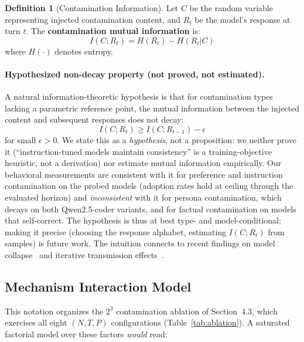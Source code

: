 \documentclass{article}
\theoremstyle{plain}
\theoremstyle{definition}
\newtheorem{definition}[theorem]{Definition}
\begin{document}
\begin{definition}[Contamination Information]
Let $C$ be the random variable representing injected contamination content, and $R_t$ be the model's response at turn $t$. The \textbf{contamination mutual information} is:
\begin{equation}
I(C; R_t) = H(R_t) - H(R_t | C)
\end{equation}
where $H(\cdot)$ denotes entropy.
\end{definition}

\paragraph{Hypothesized non-decay property (not proved, not estimated).}
A natural information-theoretic hypothesis is that for contamination types lacking a parametric reference point, the mutual information between the injected content and subsequent responses does not decay:
\begin{equation}
I(C; R_t) \geq I(C; R_{t-1}) - \epsilon
\end{equation}
for small $\epsilon > 0$. We state this as a \emph{hypothesis}, not a proposition: we neither prove it (``instruction-tuned models maintain consistency'' is a training-objective heuristic, not a derivation) nor estimate mutual information empirically. Our behavioral measurements are consistent with it for preference and instruction contamination on the probed models (adoption rates hold at ceiling through the evaluated horizon) and \emph{inconsistent} with it for persona contamination, which decays on both Qwen2.5-coder variants, and for factual contamination on models that self-correct. The hypothesis is thus at best type- and model-conditional; making it precise (choosing the response alphabet, estimating $I(C;R_t)$ from samples) is future work. The intuition connects to recent findings on model collapse~\cite{shumailov2024collapse} and iterative transmission effects~\cite{perez2025telephone}.

\subsection{Mechanism Interaction Model}
\label{sec:mechinteract}

This notation organizes the $2^3$ contamination ablation of Section~4.3, which exercises all eight $(N, T, P)$ configurations (Table~\ref{tab:ablation}). A saturated factorial model over these factors \emph{would} read:
\end{document}
